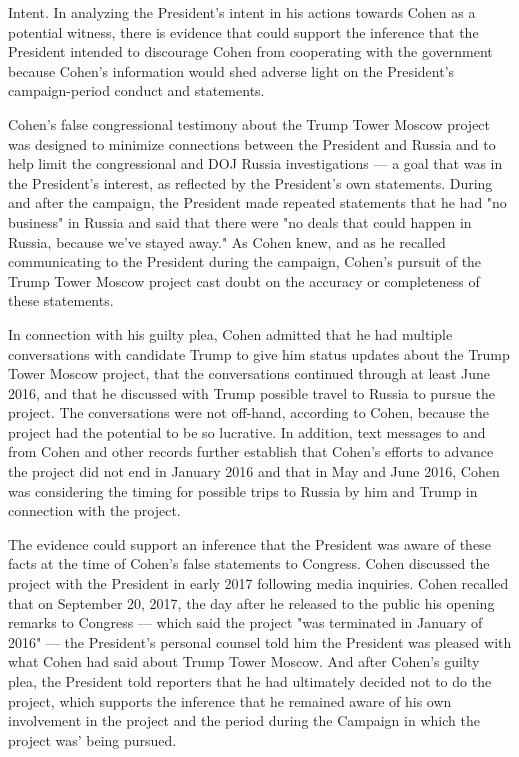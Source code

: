 {Intent.
In analyzing the President's intent in his actions towards Cohen as a potential witness, there is evidence that could support the inference that the President intended to discourage Cohen from cooperating with the government because Cohen's information would shed adverse light on the President's campaign-period conduct and statements.

Cohen's false congressional testimony about the Trump Tower Moscow project was designed to minimize connections between the President and Russia and to help limit the congressional and DOJ Russia investigations — a goal that was in the President's interest, as reflected by the President's own statements.
During and after the campaign, the President made repeated statements that he had "no business" in Russia and said that there were "no deals that could happen in Russia, because we've stayed away."
As Cohen knew, and as he recalled communicating to the President during the campaign, Cohen's pursuit of the Trump Tower Moscow project cast doubt on the accuracy or completeness of these statements.

In connection with his guilty plea, Cohen admitted that he had multiple conversations with candidate Trump to give him status updates about the Trump Tower Moscow project, that the conversations continued through at least June 2016, and that he discussed with Trump possible travel to Russia to pursue the project.
The conversations were not off-hand, according to Cohen, because the project had the potential to be so lucrative.
In addition, text messages to and from Cohen and other records further establish that Cohen's efforts to advance the project did not end in January 2016 and that in May and June 2016, Cohen was considering the timing for possible trips to Russia by him and Trump in connection with the project.

The evidence could support an inference that the President was aware of these facts at the time of Cohen's false statements to Congress.
Cohen discussed the project with the President in early 2017 following media inquiries.
Cohen recalled that on September 20, 2017, the day after he released to the public his opening remarks to Congress — which said the project "was terminated in January of 2016" — the President's personal counsel told him the President was pleased with what Cohen had said about Trump Tower Moscow.
And after Cohen's guilty plea, the President told reporters that he had ultimately decided not to do the project, which supports the inference that he remained aware of his own involvement in the project and the period during the Campaign in which the project was' being pursued.

}
